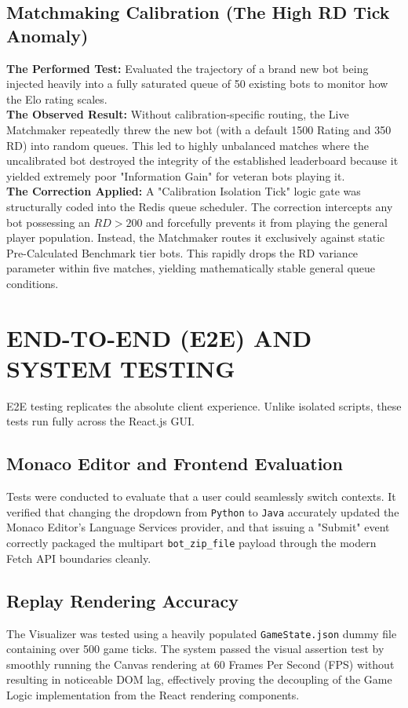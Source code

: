 \documentclass[12pt,a4paper]{report}
\begin{document}
\subsection{Matchmaking Calibration (The High RD Tick Anomaly)}
\textbf{The Performed Test:} Evaluated the trajectory of a brand new bot being injected heavily into a fully saturated queue of 50 existing bots to monitor how the Elo rating scales. \\
\textbf{The Observed Result:} Without calibration-specific routing, the Live Matchmaker repeatedly threw the new bot (with a default 1500 Rating and 350 RD) into random queues. This led to highly unbalanced matches where the uncalibrated bot destroyed the integrity of the established leaderboard because it yielded extremely poor "Information Gain" for veteran bots playing it. \\
\textbf{The Correction Applied:} A "Calibration Isolation Tick" logic gate was structurally coded into the Redis queue scheduler. The correction intercepts any bot possessing an $RD > 200$ and forcefully prevents it from playing the general player population. Instead, the Matchmaker routes it exclusively against static Pre-Calculated Benchmark tier bots. This rapidly drops the RD variance parameter within five matches, yielding mathematically stable general queue conditions.

\section{END-TO-END (E2E) AND SYSTEM TESTING}
E2E testing replicates the absolute client experience. Unlike isolated scripts, these tests run fully across the React.js GUI.

\subsection{Monaco Editor and Frontend Evaluation}
Tests were conducted to evaluate that a user could seamlessly switch contexts. It verified that changing the dropdown from \texttt{Python} to \texttt{Java} accurately updated the Monaco Editor’s Language Services provider, and that issuing a "Submit" event correctly packaged the multipart \texttt{bot\_zip\_file} payload through the modern Fetch API boundaries cleanly.

\subsection{Replay Rendering Accuracy}
The Visualizer was tested using a heavily populated \texttt{GameState.json} dummy file containing over 500 game ticks. The system passed the visual assertion test by smoothly running the Canvas rendering at 60 Frames Per Second (FPS) without resulting in noticeable DOM lag, effectively proving the decoupling of the Game Logic implementation from the React rendering components.
\end{document}
